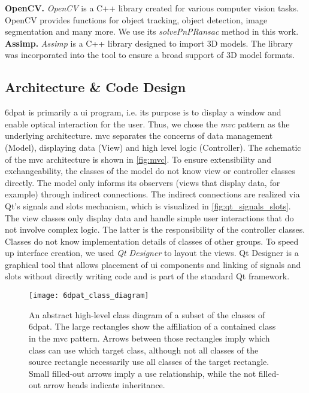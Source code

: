 \noindent\textbf{OpenCV.} \textit{OpenCV} \cite{opencv} is a C++ library created for various computer vision tasks. OpenCV provides functions for object tracking, object detection, image segmentation and many more. We use its \textit{solvePnPRansac} method in this work. \\ 

\noindent\textbf{Assimp.} \textit{Assimp} \cite{assimp} is a C++ library designed to import 3D models. The library was incorporated into the tool to ensure a broad support of 3D model formats.

\subsection{Architecture \& Code Design}

\ac{6dpat} is primarily a \ac{ui} program, i.e. its purpose is to display a window and enable optical interaction for the user. Thus, we chose the \textit{\ac{mvc}} pattern as the underlying architecture. \ac{mvc} separates the concerns of data management (Model), displaying data (View) and high level logic (Controller). The schematic of the \ac{mvc} architecture is shown in \fig \ref{fig:mvc}. To ensure extensibility and exchangeability, the classes of the model do not know view or controller classes directly. The model only informs its observers (views that display data, for example) through indirect connections. The indirect connections are realized via Qt's signals and slots mechanism, which is visualized in \fig \ref{fig:qt_signals_slots}. The view classes only display data and handle simple user interactions that do not involve complex logic. The latter is the responsibility of the controller classes. Classes do not know implementation details of classes of other groups. To speed up interface creation, we used \textit{Qt Designer} to layout the views. Qt Designer is a graphical tool that allows placement of \ac{ui} components and linking of signals and slots without directly writing code and is part of the standard Qt framework.

\begin{figure}[!tbp]
       \centering
   \texttt{[image: 6dpat\_class\_diagram]}
    \caption{An abstract high-level class diagram of a subset of the classes of \ac{6dpat}. The large rectangles show the affiliation of a contained class in the \ac{mvc} pattern. Arrows between those rectangles imply which class can use which target class, although not all classes of the source rectangle necessarily use all classes of the target rectangle. Small filled-out arrows imply a use relationship, while the not filled-out arrow heads indicate inheritance.}
   \label{fig:6dpat_class_diagram}
\end{figure}

